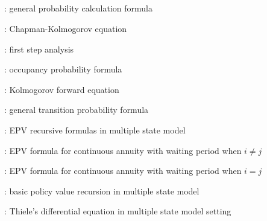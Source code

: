 \subsection*{}
\item {}: general probability calculation formula
\item {}: Chapman-Kolmogorov equation
\item {}: first step analysis
\item {}: occupancy probability formula
\item {}: Kolmogorov forward equation
\item {}: general transition probability formula
\item {}: EPV recursive formulas in multiple state model
\item {}: EPV formula for continuous annuity with waiting period when \(i\ne j\)
\item {}: EPV formula for continuous annuity with waiting period when \(i=j\)
\item {}: basic policy value recursion in multiple state model
\item {}: Thiele's differential equation in multiple state model setting


